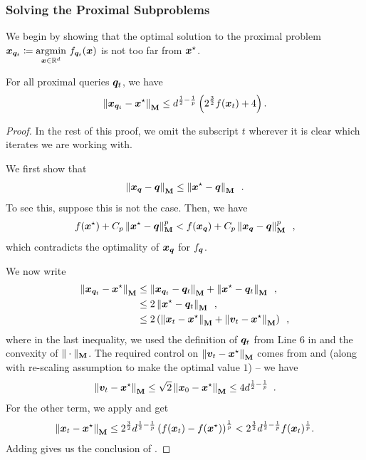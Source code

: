 \subsubsection{Solving the Proximal Subproblems}

We begin by showing that the optimal solution to the proximal problem $\bm{x}_{\bm{q}_t}\coloneqq \underset{\bm{x}\in\mathbb{R}^d}{\mathrm{argmin}}\  f_{\bm{q}_t}(\bm{x})$ is not too far from $\bm{x}^{\star}$.

\begin{lemma}
\label{lemma:gp_regression_prox_diameter}
For all proximal queries $\bm{q}_t$, we have
\begin{align*}
    \left\lVert \bm{x}_{\bm{q}_t}-\bm{x}^{\star} \right\rVert_{\mathbf{M}} \le d^{\frac{1}{2}-\frac{1}{p}}\left(2^{\frac{3}{2}}f(\bm{x}_t)+4\right).
\end{align*}
\end{lemma}
\begin{proof}
In the rest of this proof, we omit the subscript $t$ wherever it is clear which iterates we are working with. 

We first show that
\begin{align*}
    \left\lVert \bm{x}_{\bm{q}}-\bm{q} \right\rVert_{\mathbf{M}} \le \left\lVert \bm{x}^{\star}-\bm{q} \right\rVert_{\mathbf{M}}\enspace.
\end{align*}
To see this, suppose this is not the case. Then, we have
\begin{align*}
    f(\bm{x}^{\star}) + C_p\left\lVert \bm{x}^{\star}-\bm{q} \right\rVert_{\mathbf{M}}^p < f(\bm{x}_{\bm{q}}) + C_p\left\lVert \bm{x}_{\bm{q}}-\bm{q} \right\rVert_{\mathbf{M}}^p\enspace,
\end{align*}
which contradicts the optimality of $\bm{x}_{\bm{q}}$ for $f_{\bm{q}}$.

We now write
\begin{align*}
    \left\lVert \bm{x}_{\bm{q}_t}-\bm{x}^{\star} \right\rVert_{\mathbf{M}} &\le \left\lVert \bm{x}_{\bm{q}_t}-\bm{q}_t \right\rVert_{\mathbf{M}} + \left\lVert \bm{x}^{\star}-\bm{q}_t \right\rVert_{\mathbf{M}}\enspace, \\
    &\le 2\left\lVert \bm{x}^{\star}-\bm{q}_t \right\rVert_{\mathbf{M}}\enspace,\\
    &\le 2\left(\left\lVert \bm{x}_t-\bm{x}^{\star} \right\rVert_{\mathbf{M}}+\left\lVert \bm{v}_t-\bm{x}^{\star} \right\rVert_{\mathbf{M}}\right)\enspace,
\end{align*}
where in the last inequality, we used the definition of $\bm{q}_t$ from Line 6 in  and the convexity of $\|\cdot\|_{\mathbf{M}}$. The required control on $\left\lVert \bm{v}_t-\bm{x}^{\star} \right\rVert_{\mathbf{M}}$ comes from  and  (along with re-scaling assumption to make the optimal value $1$) -- we have
\begin{align*}
    \left\lVert \bm{v}_t-\bm{x}^{\star} \right\rVert_{\mathbf{M}} \le \sqrt{2}\left\lVert \bm{x}_0-\bm{x}^{\star} \right\rVert_{\mathbf{M}} \le 4d^{\frac{1}{2}-\frac{1}{p}}\enspace.
\end{align*}
For the other term, we apply  and get
\begin{align*}
    \left\lVert \bm{x}_t-\bm{x}^{\star} \right\rVert_{\mathbf{M}} \le 2^{\frac{3}{2}}d^{\frac{1}{2}-\frac{1}{p}}\left(f(\bm{x}_t)-f(\bm{x}^{\star})\right)^{\frac{1}{p}} < 2^{\frac{3}{2}}d^{\frac{1}{2}-\frac{1}{p}}f(\bm{x}_t)^{\frac{1}{p}}.
\end{align*}
Adding gives us the conclusion of .
\end{proof}

